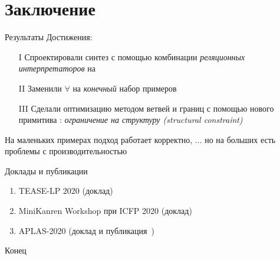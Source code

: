 \documentclass[aspectratio=169
  , xcolor={svgnames}
  , hyperref={ colorlinks,citecolor=Blue
             , linkcolor=DarkRed,urlcolor=DarkBlue}
  , russian
  ]{beamer}
\newcommand{\primi}[1]{\ensuremath{\mathbf{#1}}}
\newcommand{\ir}{\ensuremath{\mathcal{S}}}
\newcommand{\contributions}{
\begin{enumerate}
\item[I] Спроектировали синтез с помощью комбинации \emph{реляционных интерпретаторов} на \miniKanren{}
\item[II] Заменили $\forall$ на \emph{конечный} набор примеров
\item[III] Сделали оптимизацию методом ветвей и границ с помощью нового примитива \miniKanren{}: \emph{ограничение на структуру (structural constraint)}
\end{enumerate}
}
\begin{document}
\section{Заключение}

\begin{frame}{Результаты}%
Достижения: \contributions
\vspace{1em}

На маленьких примерах подход работает корректно, ... но на больших есть проблемы с производительностью 
\vspace{1em}
\end{frame}

\begin{frame}{Доклады и публикации}
\begin{enumerate}
\item TEASE-LP 2020 (доклад)
\item MiniKanren Workshop при ICFP 2020 (доклад)
\item APLAS-2020 (доклад и публикация~\cite{matchingPublication})
\end{enumerate}
\vspace{4em}
\begin{center}
{\Huge Конец}
\end{center}
\end{frame}

%
\end{document}
